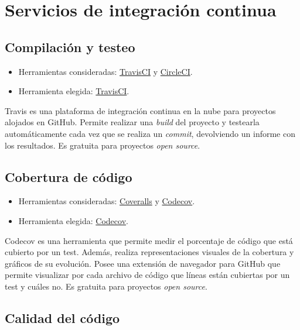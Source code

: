\section{Servicios de integración
continua}\label{servicios-de-integraciuxf3n-continua}

\subsection{Compilación y testeo}\label{compilacion-y-testeo}

\begin{itemize}
\tightlist
\item
  Herramientas consideradas: \href{https://travis-ci.org/}{TravisCI} y
  \href{https://circleci.com/}{CircleCI}.
\item
  Herramienta elegida: \href{https://travis-ci.org/}{TravisCI}.
\end{itemize}

Travis es una plataforma de integración continua en la nube para
proyectos alojados en GitHub. Permite realizar una \emph{build} del
proyecto y testearla automáticamente cada vez que se realiza un
\emph{commit}, devolviendo un informe con los resultados. Es gratuita
para proyectos \emph{open source}.

\subsection{Cobertura de código}\label{cobertura-de-codigo}

\begin{itemize}
\tightlist
\item
  Herramientas consideradas: \href{https://coveralls.io/}{Coveralls} y
  \href{https://codecov.io/}{Codecov}.
\item
  Herramienta elegida: \href{https://codecov.io/}{Codecov}.
\end{itemize}

Codecov es una herramienta que permite medir el porcentaje de código que
está cubierto por un test. Además, realiza representaciones visuales de
la cobertura y gráficos de su evolución. Posee una extensión de
navegador para GitHub que permite visualizar por cada archivo de código
que líneas están cubiertas por un test y cuáles no. Es gratuita para
proyectos \emph{open source}.

\subsection{Calidad del código}\label{calidad-del-codigo}

